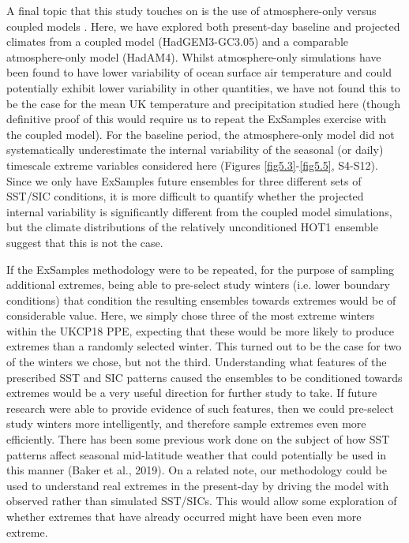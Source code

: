   A final topic that this study touches on is the use of atmosphere-only versus coupled models \citep{barsugli_basic_1998,dong_attribution_2017,fischer_biased_2018,he_does_2016}. Here, we have explored both present-day baseline and projected climates from a coupled model (HadGEM3-GC3.05) and a comparable atmosphere-only model (HadAM4). Whilst atmosphere-only simulations have been found to have lower variability of ocean surface air temperature \citep{barsugli_basic_1998} and could potentially exhibit lower variability in other quantities, we have not found this to be the case for the mean UK temperature and precipitation studied here (though definitive proof of this would require us to repeat the ExSamples exercise with the coupled model). For the baseline period, the atmosphere-only model did not systematically underestimate the internal variability of the seasonal (or daily) timescale extreme variables considered here (Figures \ref{fig5.3}-\ref{fig5.5}, S4-S12). Since we only have ExSamples future ensembles for three different sets of SST/SIC conditions, it is more difficult to quantify whether the projected internal variability is significantly different from the coupled model simulations, but the climate distributions of the relatively unconditioned HOT1 ensemble suggest that this is not the case.
  
  If the ExSamples methodology were to be repeated, for the purpose of sampling additional extremes, being able to pre-select study winters (i.e. lower boundary conditions) that condition the resulting ensembles towards extremes would be of considerable value. Here, we simply chose three of the most extreme winters within the UKCP18 PPE, expecting that these would be more likely to produce extremes than a randomly selected winter. This turned out to be the case for two of the winters we chose, but not the third. Understanding what features of the prescribed SST and SIC patterns caused the ensembles to be conditioned towards extremes would be a very useful direction for further study to take. If future research were able to provide evidence of such features, then we could pre-select study winters more intelligently, and therefore sample extremes even more efficiently. There has been some previous work done on the subject of how SST patterns affect seasonal mid-latitude weather that could potentially be used in this manner (Baker et al., 2019). On a related note, our methodology could be used to understand real extremes in the present-day by driving the model with observed rather than simulated SST/SICs. This would allow some exploration of whether extremes that have already occurred might have been even more extreme.
  
